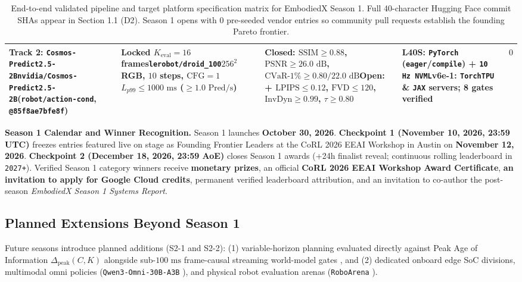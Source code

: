 \documentclass[10pt,letterpaper]{article}
\begin{document}
\begin{table}[ht!]
\begin{tabularx}{\textwidth}{>{\raggedright\arraybackslash}p{3.65cm} >{\raggedright\arraybackslash}p{2.95cm} >{\raggedright\arraybackslash}p{4.05cm} >{\raggedright\arraybackslash}X c}
\midrule
\textbf{Track 2: \texttt{Cosmos-Predict2.5-2B}}\newline\texttt{nvidia/Cosmos-Predict2.5-2B}\newline(\texttt{robot/action-cond}, \texttt{@85f8ae7bfe8f}) & \textbf{Locked $K_{\text{eval}}{=}16$} frames\newline\texttt{lerobot/droid\_100}\newline$256^2$ RGB, $10$ steps, $\text{CFG}{=}1$\newline$L_{p99} \le 1000\text{ ms}$ ($\ge 1.0\text{ Pred/s}$) & \textbf{Closed:} $\text{SSIM} \ge 0.88$, $\text{PSNR} \ge 26.0\text{ dB}$, $\text{CVaR-1\%} \ge 0.80 / 22.0\text{ dB}$\newline\textbf{Open:} + $\text{LPIPS} \le 0.12$, $\text{FVD} \le 120$, $\text{InvDyn} \ge 0.99$, $\tau \ge 0.80$ & \textbf{L40S:} \texttt{PyTorch} (\texttt{eager}/\texttt{compile}) + \texttt{10 Hz NVML}\newline\textbf{v6e-1:} \texttt{TorchTPU} \& \texttt{JAX} servers; 8 gates verified & $0$ \\
\bottomrule
\end{tabularx}
\caption{End-to-end validated pipeline and target platform specification matrix for EmbodiedX Season 1. Full 40-character Hugging Face commit SHAs appear in Section 1.1 (D2). Season 1 opens with $0$ pre-seeded vendor entries so community pull requests establish the founding Pareto frontier.}
\label{tab:pipeline_matrix}
\end{table}

\textbf{Season 1 Calendar and Winner Recognition.} Season 1 launches \textbf{October 30, 2026}. \textbf{Checkpoint 1 (November 10, 2026, 23:59 UTC)} freezes entries featured live on stage as Founding Frontier Leaders at the CoRL 2026 EEAI Workshop in Austin on \textbf{November 12, 2026}. \textbf{Checkpoint 2 (December 18, 2026, 23:59 AoE)} closes Season 1 awards (+24h finalist reveal; continuous rolling leaderboard in \texttt{2027+}). Verified Season 1 category winners receive \textbf{monetary prizes}, an official \textbf{CoRL 2026 EEAI Workshop Award Certificate}, \textbf{an invitation to apply for Google Cloud credits}, permanent verified leaderboard attribution, and an invitation to co-author the post-season \emph{EmbodiedX Season 1 Systems Report}.

\subsection{Planned Extensions Beyond Season 1}
Future seasons introduce planned additions (S2-1 and S2-2): (1) variable-horizon planning evaluated directly against Peak Age of Information $\Delta_{\text{peak}}(C, K)$ alongside sub-$100\text{ ms}$ frame-causal streaming world-model gates \cite{Chen2024diffusionforcing,Yin2025causvid,Huang2025selfforcing,Valevski2024gamengen,He2025matrixgame2}, and (2) dedicated onboard edge SoC divisions, multimodal omni policies (\texttt{Qwen3-Omni-30B-A3B} \cite{Qwen2025qwen3omni}), and physical robot evaluation arenas (\texttt{RoboArena} \cite{Atreya2025roboarena}).

\begingroup
\footnotesize
\raggedright


\endgroup
\end{document}
